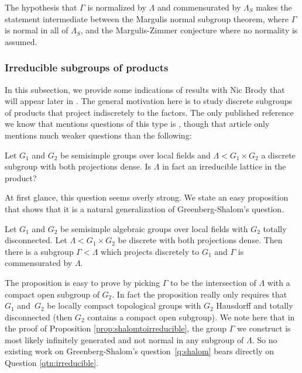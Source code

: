 \noindent The hypothesis that $\Gamma$ is normalized by $\Lambda$ and commensurated by $\Lambda_S$ makes the statement intermediate between the Margulis normal subgroup theorem, where $\Gamma$ is normal in all of $\Lambda_S$, and the Margulis-Zimmer conjecture where no normality is assumed.

\subsubsection{Irreducible subgroups of products}
\label{subsec:products}

In this subsection, we provide some indications of results with Nic Brody that will appear later in \cite{BFMVL}.
The general motivation here is to study discrete subgroups of products that project indiscretely to the factors.
The only published reference we know that mentions questions of this type is \cite{FLSS}, though that article
only mentions much weaker questions than the following:

\begin{question}
\label{qtn:irreducible}
Let $G_1$ and $G_2$ be semisimple groups over local fields and $\Lambda < G_1 \times G_2$ a discrete subgroup with both projections dense. Is $\Lambda$ in fact an irreducible lattice in the product?
\end{question}

At first glance, this question seems overly strong. We state an easy proposition that shows that it is a natural
generalization of Greenberg-Shalom's question.

\begin{prop}
\label{prop:shalomtoirreducible}
Let $G_1$ and $G_2$ be semisimple algebraic groups over local fields with $G_2$ totally disconnected. Let $\Lambda < G_1 \times G_2$ be discrete with both projections dense. Then there is a subgroup $\Gamma <\Lambda$ which projects discretely to $G_1$
and $\Gamma$ is commensurated by $\Lambda$.
\end{prop}

The proposition is easy to prove by picking $\Gamma$ to be the intersection of $\Lambda$ with a compact open subgroup
of $G_2$. In fact the proposition really only requires that~$G_1$ and~$G_2$ be locally compact topological groups with
$G_2$ Hausdorff and totally disconnected (then $G_2$ contains a compact open subgroup). We note here that in the proof of
Proposition \ref{prop:shalomtoirreducible}, the group $\Gamma$ we construct is most likely infinitely generated and
not normal in any subgroup of $\Lambda$. So no existing work on Greenberg-Shalom's question~\ref{q:shalom} bears directly on Question \ref{qtn:irreducible}.

